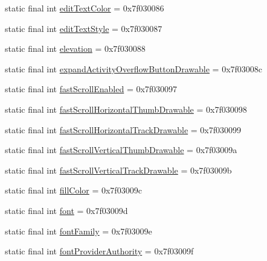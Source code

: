 \begin{DoxyCompactItemize}
\item 
static final int \mbox{\hyperlink{classcom_1_1synnapps_1_1carouselview_1_1_r_1_1attr_ad1008887ebe71b3e83fb376d3d7cbca3}{edit\+Text\+Color}} = 0x7f030086
\item 
static final int \mbox{\hyperlink{classcom_1_1synnapps_1_1carouselview_1_1_r_1_1attr_a9f21a27bae26672285fc94e63fbe2101}{edit\+Text\+Style}} = 0x7f030087
\item 
static final int \mbox{\hyperlink{classcom_1_1synnapps_1_1carouselview_1_1_r_1_1attr_aff4a539d96f105744b0f911e9015895c}{elevation}} = 0x7f030088
\item 
static final int \mbox{\hyperlink{classcom_1_1synnapps_1_1carouselview_1_1_r_1_1attr_a587dcb7c4fbedce2317efd334d47a3e2}{expand\+Activity\+Overflow\+Button\+Drawable}} = 0x7f03008c
\item 
static final int \mbox{\hyperlink{classcom_1_1synnapps_1_1carouselview_1_1_r_1_1attr_ad29ccca7ca52c016b19deef57397d376}{fast\+Scroll\+Enabled}} = 0x7f030097
\item 
static final int \mbox{\hyperlink{classcom_1_1synnapps_1_1carouselview_1_1_r_1_1attr_a2a7f943b3c83df6e273d532b3ef9583d}{fast\+Scroll\+Horizontal\+Thumb\+Drawable}} = 0x7f030098
\item 
static final int \mbox{\hyperlink{classcom_1_1synnapps_1_1carouselview_1_1_r_1_1attr_ad76a8d52c367b7d7464cf5141f62d806}{fast\+Scroll\+Horizontal\+Track\+Drawable}} = 0x7f030099
\item 
static final int \mbox{\hyperlink{classcom_1_1synnapps_1_1carouselview_1_1_r_1_1attr_a1b3a933acfc8c7cc7cac503a2201050f}{fast\+Scroll\+Vertical\+Thumb\+Drawable}} = 0x7f03009a
\item 
static final int \mbox{\hyperlink{classcom_1_1synnapps_1_1carouselview_1_1_r_1_1attr_aa9c1d2a23b872b591f6a4008f7663c04}{fast\+Scroll\+Vertical\+Track\+Drawable}} = 0x7f03009b
\item 
static final int \mbox{\hyperlink{classcom_1_1synnapps_1_1carouselview_1_1_r_1_1attr_a3377bf1186e88f7c56fb2961411eb5dd}{fill\+Color}} = 0x7f03009c
\item 
static final int \mbox{\hyperlink{classcom_1_1synnapps_1_1carouselview_1_1_r_1_1attr_adfdffe93b058ab559979db778c0251af}{font}} = 0x7f03009d
\item 
static final int \mbox{\hyperlink{classcom_1_1synnapps_1_1carouselview_1_1_r_1_1attr_a51f2e9cbe02152fe9a64e6fa864285c0}{font\+Family}} = 0x7f03009e
\item 
static final int \mbox{\hyperlink{classcom_1_1synnapps_1_1carouselview_1_1_r_1_1attr_a3f7b3bde2b65bf1fd99e106ef9298980}{font\+Provider\+Authority}} = 0x7f03009f

\end{DoxyCompactItemize}
